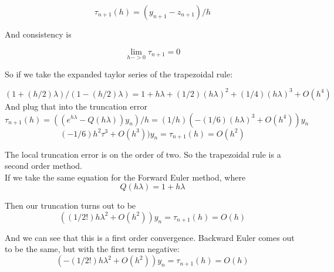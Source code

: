 \documentclass{article}
\begin{document}
\begin{equation}
    \tau_{n+1}(h) = (y_{n+1} - z_{n+1})/h
\end{equation}

And consistency is

\begin{equation}
    \lim_{h->0}\tau_{n+1} = 0
\end{equation}

So if we take the expanded taylor series of the trapezoidal rule:

\begin{equation}
    (1+(h/2)\lambda)/(1-(h/2)\lambda) = 1 + h\lambda + (1/2)(h\lambda)^2 + (1/4)(h\lambda)^3 + O(h^4)
\end{equation}
And plug that into the truncation error
\begin{equation}
    \tau_{n+1}(h) = ((e^{h\lambda} - Q(h\lambda))y_n)/h = (1/h)(-(1/6)(h\lambda)^3 + O(h^4))y_n    
\end{equation}
\begin{equation}
    (-1/6)h^2\tau^3 + O(h^3))y_n = \tau_{n+1}(h) = O(h^2)
\end{equation}

The local truncation error is on the order of two. So the trapezoidal rule is a second order method.\\

If we take the same equation for the Forward Euler method, where 
\begin{equation}
    Q(h\lambda) = 1 + h\lambda
\end{equation}

Then our truncation turns out to be
\begin{equation}
    ((1/2!)h\lambda^2 + O(h^2))y_n = \tau_{n+1}(h) = O(h)
\end{equation}

And we can see that this is a first order convergence. Backward Euler comes out to be
the same, but with the first term negative:
\begin{equation}
    (-(1/2!)h\lambda^2 + O(h^2))y_n = \tau_{n+1}(h) = O(h)
\end{equation}
\end{document}
